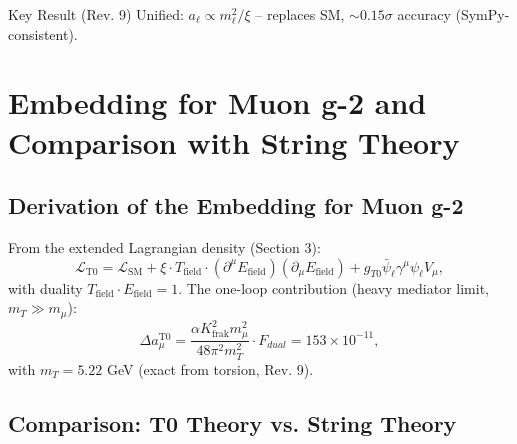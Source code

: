 \documentclass[12pt,a4paper]{article}
\theoremstyle{definition}
\begin{document}
	\begin{result}{Key Result (Rev. 9)}
		Unified: $a_\ell \propto m_\ell^2 / \xi$ -- replaces SM, $\sim 0.15 \sigma$ accuracy (SymPy-consistent).
	\end{result}
	
	\section{Embedding for Muon g-2 and Comparison with String Theory}
	\subsection{Derivation of the Embedding for Muon g-2}
	
	From the extended Lagrangian density (Section 3):
	\begin{equation}
		\mathcal{L}_{\text{T0}} = \mathcal{L}_{\text{SM}} + \xi \cdot T_{\text{field}} \cdot (\partial^\mu E_{\text{field}})(\partial_\mu E_{\text{field}}) + g_{T0} \bar{\psi}_\ell \gamma^\mu \psi_\ell V_\mu,
	\end{equation}
	with duality $T_{\text{field}} \cdot E_{\text{field}} = 1$. The one-loop contribution (heavy mediator limit, $m_T \gg m_\mu$):
	\begin{equation}
		\Delta a_\mu^{\text{T0}} = \frac{\alpha K_{\text{frak}}^2 m_\mu^2}{48 \pi^2 m_T^2} \cdot F_{dual} = 153 \times 10^{-11},
	\end{equation}
	with $m_T = 5.22$ GeV (exact from torsion, Rev. 9).
	
	\subsection{Comparison: T0 Theory vs. String Theory}
	
\end{document}
